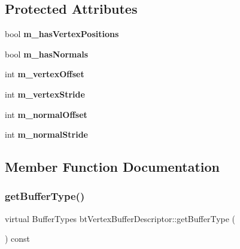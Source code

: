 \subsection*{Protected Attributes}
\begin{DoxyCompactItemize}
\item 
\mbox{\label{classbtVertexBufferDescriptor_a3e861a636f88c138ba3563b62c471057}} 
bool {\bfseries m\+\_\+has\+Vertex\+Positions}
\item 
\mbox{\label{classbtVertexBufferDescriptor_adfd35400605cff7d521282750283a7a2}} 
bool {\bfseries m\+\_\+has\+Normals}
\item 
\mbox{\label{classbtVertexBufferDescriptor_a0cc09360818e4b0d16e6ca0b8746b6ae}} 
int {\bfseries m\+\_\+vertex\+Offset}
\item 
\mbox{\label{classbtVertexBufferDescriptor_afd308d4b38d5050d0ad8da232518f435}} 
int {\bfseries m\+\_\+vertex\+Stride}
\item 
\mbox{\label{classbtVertexBufferDescriptor_aec53d6fab025322ed6f6efe8be561a74}} 
int {\bfseries m\+\_\+normal\+Offset}
\item 
\mbox{\label{classbtVertexBufferDescriptor_afd801257bdefce6cee72d77e4660ecd9}} 
int {\bfseries m\+\_\+normal\+Stride}
\end{DoxyCompactItemize}


\subsection{Member Function Documentation}
\mbox{\label{classbtVertexBufferDescriptor_a1744d7c3b3452f130a215927d63ab130}} 
\subsubsection{\texorpdfstring{get\+Buffer\+Type()}{getBufferType()}}
{\footnotesize\ttfamily virtual Buffer\+Types bt\+Vertex\+Buffer\+Descriptor\+::get\+Buffer\+Type (\begin{DoxyParamCaption}{ }\end{DoxyParamCaption}) const\hspace{0.3cm}{\ttfamily [pure virtual]}}

